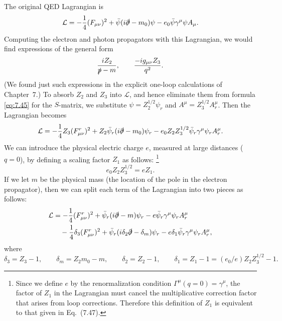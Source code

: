 The original QED Lagrangian is
\begin{equation}
  \mathcal{L} = -\frac{1}{4}(F_{\mu\nu})^2
    + \bar{\psi}(i\slashed{\partial} - m_0)\psi - e_0\bar{\psi}\gamma^\mu\psi
      A_\mu .
\end{equation}
Computing the electron and photon propagators with this Lagrangian, we would
find expressions of the general form
\begin{equation}
  \frac{iZ_2}{\slashed{p}-m},\qquad \frac{-ig_{\mu\nu}Z_3}{q^2} .
\end{equation}
(We found just such expressions in the explicit one-loop calculations of
Chapter~7.)  To absorb $Z_2$ and $Z_3$ into $\mathcal{L}$, and hence eliminate
them from formula \eqref{eq:7.45} for the $S$-matrix, we substitute
$\psi = Z_2^{1/2}\psi_r$ and $A^\mu = Z_3^{1/2}A_r^\mu$.  Then the Lagrangian
becomes
\begin{equation}
  \mathcal{L} = -\frac{1}{4}Z_3(F_{\mu\nu}^r)^2 + Z_2\bar{\psi}_r
    (i\slashed{\partial} - m_0)\psi_r - e_0Z_2Z_3^{1/2}\bar{\psi}_r\gamma^\mu
      \psi_r A_r^\mu .
  \label{eq:10.36}
\end{equation}
We can introduce the physical electric charge $e$, measured at large distances
($q = 0$), by defining a scaling factor $Z_1$ as follows:%
\footnote{Since we define $e$ by the renormalization condition
$\Gamma^\mu(q=0) = \gamma^\mu$, the factor of $Z_1$ in the Lagrangian must
cancel the multiplicative correction factor that arises from loop corrections.
Therefore this definition of $Z_1$ is equivalent to that given in
Eq.~(7.47).}
\begin{equation}
  e_0Z_2Z_3^{1/2} = eZ_1 .
  \label{eq:10.37}
\end{equation}
If we let $m$ be the physical mass (the location of the pole in the electron
propagator), then we can split each term of the Lagrangian into two pieces as
follows:
\begin{equation}
  \begin{aligned}
    \mathcal{L} &= -\frac{1}{4}(F_{\mu\nu}^r)^2 + \bar{\psi}_r(i\slashed{\partial}
      - m)\psi_r - e\bar{\psi}_r\gamma^\mu\psi_r A_r^\mu\\
    &\quad - \frac{1}{4}\delta_3(F_{\mu\nu}^r)^2 + \bar{\psi}_r(i\delta_2\slashed{\partial}
      - \delta_m)\psi_r - e\delta_1\bar{\psi}_r\gamma^\mu\psi_r A_r^\mu ,
  \end{aligned}
  \label{eq:10.38}
\end{equation}
where
\begin{equation}
  \delta_3 = Z_3 - 1,\qquad
  \delta_m = Z_2m_0 - m,\qquad
  \delta_2 = Z_2 - 1,\qquad
  \delta_1 = Z_1 - 1 = (e_0/e)Z_2Z_3^{1/2} - 1 .
\end{equation}

